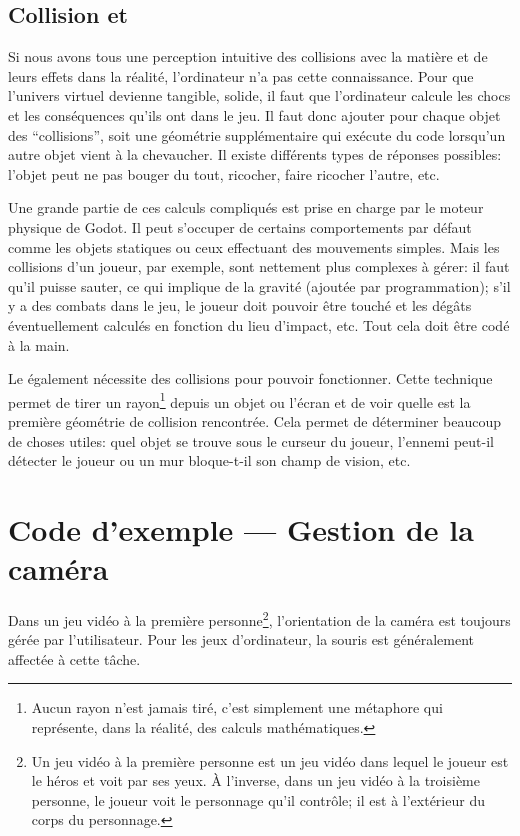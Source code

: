 \subsection{Collision et }
\label{sec:collisions}
Si nous avons tous une perception intuitive des collisions avec la matière et de leurs effets dans la réalité, l'ordinateur n'a pas cette connaissance. Pour que l'univers virtuel devienne tangible, solide, il faut que l'ordinateur calcule les chocs et les conséquences qu'ils ont dans le jeu. Il faut donc ajouter pour chaque objet des \enquote{collisions}, soit une géométrie supplémentaire qui exécute du code lorsqu'un autre objet vient à la chevaucher. Il existe différents types de réponses possibles: l'objet peut ne pas bouger du tout, ricocher, faire ricocher l'autre, etc.

Une grande partie de ces calculs compliqués est prise en charge par le moteur physique de Godot. Il peut s'occuper de certains comportements par défaut comme les objets statiques ou ceux effectuant des mouvements simples. Mais les collisions d'un joueur, par exemple, sont nettement plus complexes à gérer: il faut qu'il puisse sauter, ce qui implique de la gravité (ajoutée par programmation); s'il y a des combats dans le jeu, le joueur doit pouvoir être touché et les dégâts éventuellement calculés en fonction du lieu d'impact, etc. Tout cela doit être codé à la main.

Le  également nécessite des collisions pour pouvoir fonctionner. Cette technique permet de tirer un rayon\footnote{Aucun rayon n'est jamais tiré, c'est simplement une métaphore qui représente, dans la réalité, des calculs mathématiques.} depuis un objet ou l'écran et de voir quelle est la première géométrie de collision rencontrée. Cela permet de déterminer beaucoup de choses utiles: quel objet se trouve sous le curseur du joueur, l'ennemi peut-il détecter le joueur ou un mur bloque-t-il son champ de vision, etc.



\section{Code d'exemple --- Gestion de la caméra}

Dans un jeu vidéo à la première personne\footnote{Un jeu vidéo à la première personne est un jeu vidéo dans lequel le joueur est  le héros et voit par ses yeux. À l'inverse, dans un jeu vidéo à la troisième personne, le joueur voit le personnage qu'il contrôle; il est à l'extérieur du corps du personnage.}, l'orientation de la caméra est toujours gérée par l'utilisateur. Pour les jeux d'ordinateur, la souris est généralement affectée à cette tâche.

